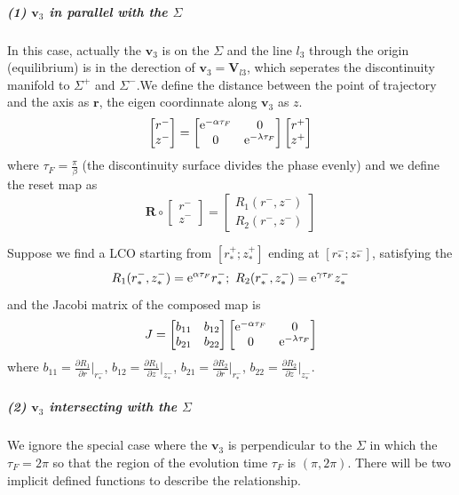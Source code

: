 \documentclass[a4paper,10pt]{article}
\begin{document}
	\subparagraph{(1) $\mathbf{v}_3$ in parallel with the $\Sigma$}
	In this case, actually the $\mathbf{v}_3$ is on the $\Sigma$ and the line $l_3$ through the origin (equilibrium) is in the derection of $\mathbf{v}_3 = \mathbf{V}_{l3}$, which seperates the discontinuity manifold to $\Sigma^+$ and $\Sigma^-$.We define the distance between the point of trajectory and the axis as $\mathbf{r}$, the eigen coordinnate along $\mathbf{v}_3$ as $z$.
	\begin{equation}
	\begin{bmatrix}
	{r}^-\\{z}^-
	\end{bmatrix}
	=
	\begin{bmatrix}
	{\rm e}^{-\alpha \tau_F} & 0\\ 0 & {\rm e}^{-\lambda \tau_F}
	\end{bmatrix} \begin{bmatrix}
	{r}^+\\{z}^+
	\end{bmatrix}
	\end{equation}
	where $\tau_F =\frac{\pi}{\beta}$ (the discontinuity surface divides the phase evenly) and we define the reset map as \[ \mathbf{R} \circ \begin{bmatrix}
	{r}^-\\{z}^-
	\end{bmatrix} = \begin{bmatrix}
	{R}_1(r^-,z^-)\\{R}_2(r^-,z^-)
	\end{bmatrix}\]
	
	Suppose we find a LCO starting from $[r^+_*;z^+_*]$ ending at $[r^-_*;z^-_*]$, satisfying  the
	$$R_1(r^-_*,z^-_*) = {\rm e}^{\alpha \tau_F} r^-_*;~ R_2(r^-_*,z^-_*) = {\rm e}^{\gamma \tau_F} z^-_*$$
	and the Jacobi matrix of the composed map is 
	\begin{equation}
	J = \begin{bmatrix}
	b_{11}& b_{12}  \\  b_{21} & b_{22}
	\end{bmatrix} 
	\begin{bmatrix}
	{\rm e}^{-\alpha \tau_F} & 0\\ 0 & {\rm e}^{-\lambda \tau_F}
	\end{bmatrix}
	\end{equation}
	where 
	$b_{11} = \frac{\partial {R_1}}{\partial r}|_{r_*^-}$, $b_{12} = \frac{\partial {R_1}}{\partial z}|_{z_*^-}$, $b_{21} = \frac{\partial {R_2}}{\partial r}|_{r_*^-}$, $b_{22} = \frac{\partial {R_2}}{\partial z}|_{z_*^-}$.
	\subparagraph{(2) $\mathbf{v}_3$ intersecting with the $\Sigma$} 
	We ignore the special case where the $\mathbf{v}_3$ is perpendicular to the $\Sigma$ in which the $\tau_F = 2\pi$ so that the region of the evolution time $\tau_F$ is $(\pi,2\pi)$.
	There will be two implicit defined functions to describe the relationship.
	
\end{document}
